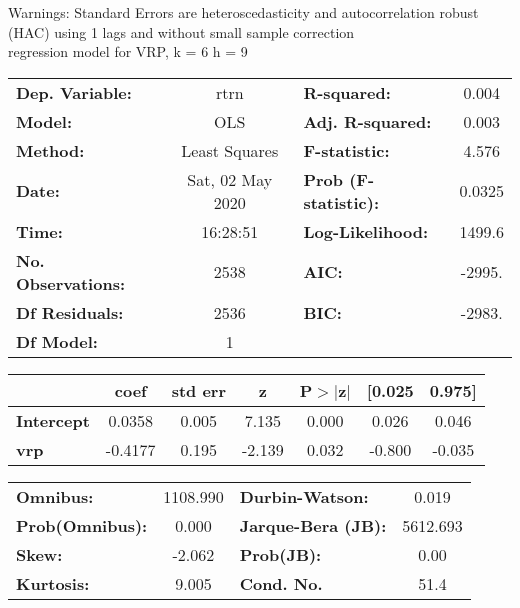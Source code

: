 Warnings: \newline
 [1] Standard Errors are heteroscedasticity and autocorrelation robust (HAC) using 1 lags and without small sample correction\\ 

regression model for VRP, k = 6 h = 9\begin{center}
\begin{tabular}{lclc}
\toprule
\textbf{Dep. Variable:}    &       rtrn       & \textbf{  R-squared:         } &     0.004   \\
\textbf{Model:}            &       OLS        & \textbf{  Adj. R-squared:    } &     0.003   \\
\textbf{Method:}           &  Least Squares   & \textbf{  F-statistic:       } &     4.576   \\
\textbf{Date:}             & Sat, 02 May 2020 & \textbf{  Prob (F-statistic):} &   0.0325    \\
\textbf{Time:}             &     16:28:51     & \textbf{  Log-Likelihood:    } &    1499.6   \\
\textbf{No. Observations:} &        2538      & \textbf{  AIC:               } &    -2995.   \\
\textbf{Df Residuals:}     &        2536      & \textbf{  BIC:               } &    -2983.   \\
\textbf{Df Model:}         &           1      & \textbf{                     } &             \\
\bottomrule
\end{tabular}
\begin{tabular}{lcccccc}
                   & \textbf{coef} & \textbf{std err} & \textbf{z} & \textbf{P$> |$z$|$} & \textbf{[0.025} & \textbf{0.975]}  \\
\midrule
\textbf{Intercept} &       0.0358  &        0.005     &     7.135  &         0.000        &        0.026    &        0.046     \\
\textbf{vrp}       &      -0.4177  &        0.195     &    -2.139  &         0.032        &       -0.800    &       -0.035     \\
\bottomrule
\end{tabular}
\begin{tabular}{lclc}
\textbf{Omnibus:}       & 1108.990 & \textbf{  Durbin-Watson:     } &    0.019  \\
\textbf{Prob(Omnibus):} &   0.000  & \textbf{  Jarque-Bera (JB):  } & 5612.693  \\
\textbf{Skew:}          &  -2.062  & \textbf{  Prob(JB):          } &     0.00  \\
\textbf{Kurtosis:}      &   9.005  & \textbf{  Cond. No.          } &     51.4  \\
\bottomrule
\end{tabular}
\end{center}

